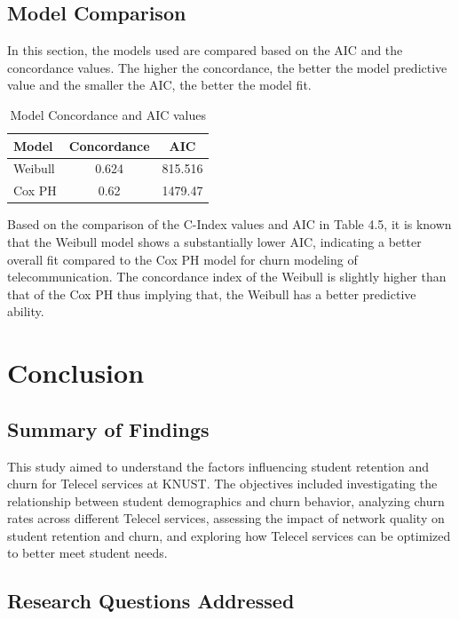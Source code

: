 \documentclass[12pt]{report} %
\begin{document}
\section{Model Comparison}

In this section, the models used are compared based on the AIC and the concordance values. The higher the concordance, the better the model predictive value and the smaller the AIC, the better the model fit.

\begin{table}[H]
\centering
\begin{tabular}{lcc}
\toprule
\textbf{Model} & \textbf{Concordance} & \textbf{AIC} \\
\midrule
Weibull & 0.624 & 815.516 \\
Cox PH & 0.62 & 1479.47 \\
\bottomrule
\end{tabular}
\caption{Model Concordance and AIC values}
\end{table}

Based on the comparison of the C-Index values and AIC in Table 4.5, it is known that the Weibull model shows a substantially lower AIC, indicating a better overall fit compared to the Cox PH model for churn modeling of telecommunication. The concordance index of the Weibull is slightly higher than that of the Cox PH thus implying that, the Weibull has a better predictive ability.

\newpage
\chapter{Conclusion}

\section{Summary of Findings}

This study aimed to understand the factors influencing student retention and churn for Telecel services at KNUST. The objectives included investigating the relationship between student demographics and churn behavior, analyzing churn rates across different Telecel services, assessing the impact of network quality on student retention and churn, and exploring how Telecel services can be optimized to better meet student needs.

\section{Research Questions Addressed}
\end{document}
